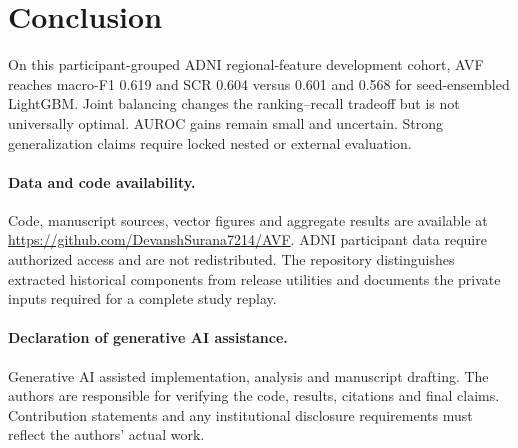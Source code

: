\section{Conclusion}
On this participant-grouped ADNI regional-feature development cohort, AVF reaches macro-F1 0.619 and SCR 0.604 versus 0.601 and 0.568 for seed-ensembled LightGBM. Joint balancing changes the ranking--recall tradeoff but is not universally optimal. AUROC gains remain small and uncertain. Strong generalization claims require locked nested or external evaluation.

\paragraph{Data and code availability.} Code, manuscript sources, vector figures and aggregate results are available at \url{https://github.com/DevanshSurana7214/AVF}. ADNI participant data require authorized access and are not redistributed. The repository distinguishes extracted historical components from release utilities and documents the private inputs required for a complete study replay.

\paragraph{Declaration of generative AI assistance.} Generative AI assisted implementation, analysis and manuscript drafting. The authors are responsible for verifying the code, results, citations and final claims. Contribution statements and any institutional disclosure requirements must reflect the authors' actual work.
